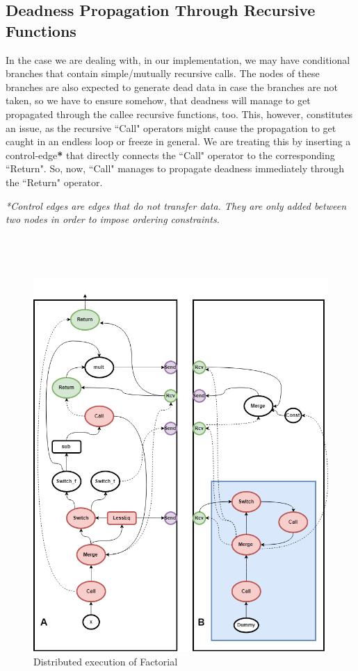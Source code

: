 \documentclass[ack,preface]{dithesis}
\begin{document}
    \subsection{Deadness Propagation Through Recursive Functions}

In the case we are dealing with, in our implementation, we may have conditional branches that contain simple/mutually recursive calls. The nodes of these branches are  also expected to generate dead data in case the branches are not taken, so we have to ensure somehow, that deadness will manage to get propagated through the callee recursive functions, too. This, however, constitutes an issue, as the recursive ``Call" operators might cause the propagation to get caught in an endless loop or freeze in general. We are treating this by inserting a control-edge\textbf{*} that directly connects  the ``Call" operator to the corresponding ``Return". So, now, ``Call" manages to propagate deadness immediately through the ``Return" operator. 

\textit{*Control edges are edges that do not transfer data. They are only added between two nodes in order to impose ordering constraints.\\\\\\\\}

\begin{figure}
\centering
\includegraphics[scale=0.6]{figures/DistrFac}
\caption{Distributed execution of Factorial}
\end{figure}
\end{document}
